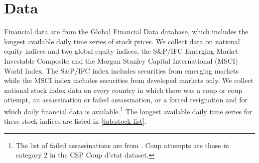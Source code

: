 \documentclass[12pt,final,fleqn]{article}
\theoremstyle{plain}
\begin{document}
\section{Data}

Financial data are from the Global Financial Data database, which includes the longest available daily time series of stock prices. We collect data on national equity indices and two global equity indices, the S\&P/IFC Emerging Market Investable Composite and the Morgan Stanley Capital International (MSCI) World Index. The S\&P/IFC index includes securities from emerging markets while the MSCI index includes securities from developed markets only. We collect national stock index data on every country in which there was a coup or coup attempt, an assassination or failed assassination, or a forced resignation and for which daily financial data is available.\footnote{The list of failed assassinations are from \citet{jones2009hit}. Coup attempts are those in category 2 in the CSP Coup d'etat dataset.} The longest available daily time series for these stock indices are listed in \autoref{tab:stock-list}.
\end{document}
